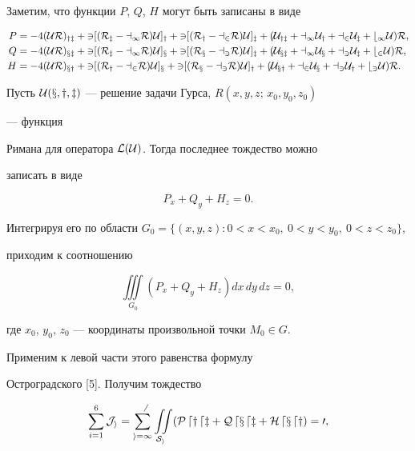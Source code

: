  


Заметим, что функции $P$, $Q$, $H$ могут быть записаны в виде 


\begin{align*} 


P&=-4(\U R)_{yz}+3[(R_z-a_1R)\U]_y+3[(R_y-a_2R)\U]_z+


6(\U_{yz}+a_1\U_y+a_2\U_z+b_1\U)R,\\ 


% 


Q&=-4(\U R)_{xz}+3[(R_z-a_1R)\U]_x+3[(R_x-a_3R)\U]_z+


6(\U_{xz}+a_1\U_x+a_3\U_z+b_2\U)R,\\


% 


H&=-4(\U R)_{xy}+3[(R_y-a_2R)\U]_x+3[(R_x-a_3R)\U]_y+


6(\U_{xy}+a_2\U_x+a_3\U_y+b_3\U)R.\end{align*} 


 


Пусть $\cal U(x,y,z)$ --- решение задачи Гурса, $R(x,y,z;\,x_0,y_0,z_0)$ 


--- функция 


Римана для оператора $\cal L(\cal U)$. Тогда последнее тождество можно 


записать в виде 


$$ 


P_x+Q_y+H_z=0. 


$$ 


 


Интегрируя его по области $G_0=\{(x,y,z):0<x<x_0,\ 0<y<y_0,\ 


0<z<z_0\}$, 


приходим к соотношению 


$$ 


\iiint\limits_{G_0}(P_x+Q_y+H_z)dx\,dy\,dz=0, 


$$ 


где $x_0$, $y_0$, $z_0$ --- координаты произвольной точки $M_0\in G$. 


Применим к левой части этого равенства формулу 


Остроградского [5]. Получим тождество 


$$ 


\sum^6_{i=1}\J_i=\sum^6_{i=1}\iint\limits_{\cal S_i}(P\,dy\,dz+ 


Q\,dx\,dz+H\,dx\,dy)=0, 


$$ 



